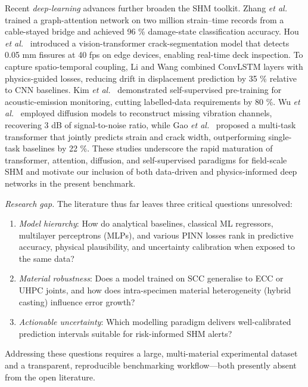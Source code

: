 \documentclass{article}
\begin{document}
Recent \textit{deep-learning} advances further broaden the SHM toolkit.  
Zhang \textit{et al.}\ \cite{Zhang2024GAT} trained a graph-attention network on two million strain–time records from a cable-stayed bridge and achieved 96 \% damage-state classification accuracy.  
Hou \textit{et al.}\ \cite{Hou2024ViT} introduced a vision-transformer crack-segmentation model that detects 0.05 mm fissures at 40 fps on edge devices, enabling real-time deck inspection.  
To capture spatio-temporal coupling, Li and Wang \cite{Li2025ConvLSTM} combined ConvLSTM layers with physics-guided losses, reducing drift in displacement prediction by 35 \% relative to CNN baselines.  
Kim \textit{et al.}\ \cite{Kim2025SSL} demonstrated self-supervised pre-training for acoustic-emission monitoring, cutting labelled-data requirements by 80 \%.  
Wu \textit{et al.}\ \cite{Wu2024Diffusion} employed diffusion models to reconstruct missing vibration channels, recovering 3 dB of signal-to-noise ratio, while Gao \textit{et al.}\ \cite{Gao2025MultiTask} proposed a multi-task transformer that jointly predicts strain and crack width, outperforming single-task baselines by 22 \%.  
These studies underscore the rapid maturation of transformer, attention, diffusion, and self-supervised paradigms for field-scale SHM and motivate our inclusion of both data-driven and physics-informed deep networks in the present benchmark.


\smallskip
\noindent\emph{Research gap.}  
The literature thus far leaves three critical questions unresolved:

\begin{enumerate}[label=(\alph*)]
    \item \emph{Model hierarchy}: How do analytical baselines, classical ML regressors, multilayer perceptrons (MLPs), and various PINN losses rank in predictive accuracy, physical plausibility, and uncertainty calibration when exposed to the same data?
    \item \emph{Material robustness}: Does a model trained on SCC generalise to ECC or UHPC joints, and how does intra-specimen material heterogeneity (hybrid casting) influence error growth?
    \item \emph{Actionable uncertainty}: Which modelling paradigm delivers well-calibrated prediction intervals suitable for risk-informed SHM alerts?
\end{enumerate}

\noindent Addressing these questions requires a large, multi-material experimental dataset and a transparent, reproducible benchmarking workflow—both presently absent from the open literature.
\end{document}
